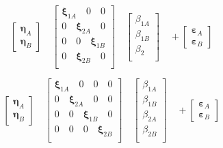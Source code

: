 \begin{equation}
\label{nul22}
\left[\begin{array}{l}
\boldsymbol{\eta}_A \\
\boldsymbol{\eta}_B 
\end{array}\right] \quad
\left[\begin{array}{ccc}
\boldsymbol{\xi}_{1A}\quad 0 \quad0\\
0 \quad\boldsymbol{\xi}_{2A} \quad0\\
0 \quad0 \quad\boldsymbol{\xi}_{1B}\\
0 \quad\boldsymbol{\xi}_{2B} \quad0\\
\end{array}\right] \quad
\left[\begin{array}{l}
\beta_{1A} \\
\beta_{1B} \\
\beta_2 \\
\end{array}\right]  \quad +
\left[\begin{array}{l}
\boldsymbol{\varepsilon}_A \\
\boldsymbol{\varepsilon}_B 
\end{array}\right] 
\end{equation}

\begin{equation}
\label{al2}
\left[\begin{array}{l}
\boldsymbol{\eta}_A \\
\boldsymbol{\eta}_B 
\end{array}\right] \quad
\left[\begin{array}{ccc}
\boldsymbol{\xi}_{1A}\quad 0 \quad0 \quad0\\
0 \quad\boldsymbol{\xi}_{2A}\quad0 \quad0\\
0 \quad0 \quad\boldsymbol{\xi}_{1B} \quad0\\
0 \quad0 \quad0 \quad \boldsymbol{\xi}_{2B}\\
\end{array}\right] \quad
\left[\begin{array}{l}
\beta_{1A} \\
\beta_{1B} \\
\beta_{2A} \\
\beta_{2B} \\
\end{array}\right]  \quad +
\left[\begin{array}{l}
\boldsymbol{\varepsilon}_A \\
\boldsymbol{\varepsilon}_B 
\end{array}\right] 
\end{equation}


